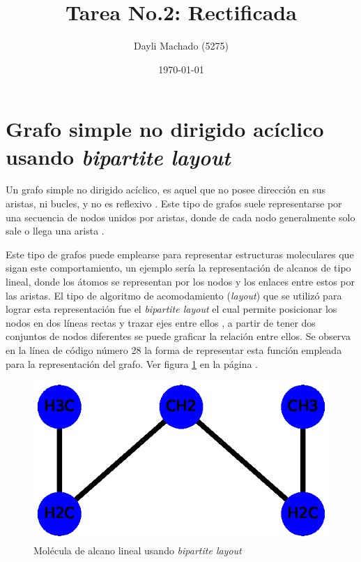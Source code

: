 \documentclass{article}
\begin{document}
\title{Tarea No.2: Rectificada}
\author{Dayli Machado (5275)}
\date{\today}
\maketitle



\section{Grafo simple no dirigido acíclico usando \textit{bipartite layout}}

Un grafo simple no dirigido acíclico, es aquel que no posee dirección en sus aristas, ni bucles, y no es reflexivo \cite{Elisa}. Este tipo de grafos suele representarse por una secuencia de nodos unidos por aristas, donde de cada nodo generalmente solo sale o llega una arista \cite{Net}. 

Este tipo de grafos puede emplearse para representar estructuras moleculares que sigan este comportamiento, un ejemplo sería la representación de alcanos de tipo lineal, donde los átomos se representan por los nodos y los enlaces entre estos por las aristas. El tipo de algoritmo de acomodamiento (\textit{layout}) que se utilizó para lograr esta representación fue el \textit{bipartite layout} el cual permite posicionar los nodos en dos líneas rectas y trazar ejes entre ellos \cite{layout}, a partir de tener dos conjuntos de nodos diferentes se puede graficar la relación entre ellos. Se observa en la línea de código número 28 la forma de representar esta función empleada para la representación del grafo. Ver figura \ref{fig:Fig01} en la página \pageref{fig:Fig01}.

\newpage


\begin{figure}[htbp]
    \centering
    \includegraphics[scale=0.4]{imagenes1/Fig01.eps}
    \caption{Molécula de alcano lineal usando \textit{bipartite layout}}
    \label{fig:Fig01}
\end{figure}
\end{document}
